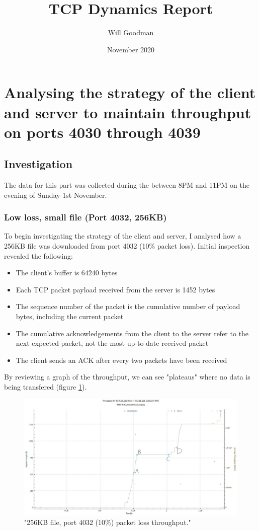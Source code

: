 \documentclass[12pt]{article}
\title{TCP Dynamics Report}
\date{November 2020}
\author{Will Goodman}
\begin{document}
\maketitle

\section{Analysing the strategy of the client and server to maintain throughput on ports 4030 through 4039}
\subsection*{Investigation}
The data for this part was collected during the between 8PM and 11PM on the evening of Sunday 1st November.

\subsubsection*{Low loss, small file (Port 4032, 256KB)}
To begin investigating the strategy of the client and server, I analysed how a 256KB file was downloaded from port 4032 (10\% packet loss).
Initial inspection revealed the following:
\begin{itemize}
  \item The client's buffer is 64240 bytes
  \item Each TCP packet payload received from the server is 1452 bytes
  \item The sequence number of the packet is the cumulative number of payload bytes, including the current packet
  \item The cumulative acknowledgements from the client to the server refer to the next expected packet, not the most up-to-date received packet
  \item The client sends an ACK after every two packets have been received
\end{itemize}

By reviewing a graph of the throughput, we can see "plateaus" where no data is being transfered (figure \ref{figure1: 4032:256KB Throughput}).

\begin{figure}[!htbp]
  \centering
  \includegraphics[scale=0.3]{4032_256KB_throughput-marked-points.jpg}
  \caption{"256KB file, port 4032 (10\%) packet loss throughput."}
  \label{figure1: 4032:256KB Throughput}
\end{figure}
\end{document}
